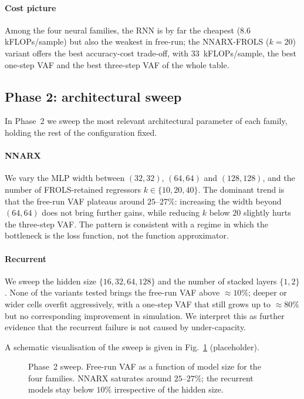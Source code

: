 \documentclass[conference]{IEEEtran}
\begin{document}
\paragraph{Cost picture} Among the four neural families, the RNN is
by far the cheapest ($8.6$\,kFLOPs/sample) but also the weakest in
free-run; the NNARX-FROLS ($k=20$) variant offers the best
accuracy-cost trade-off, with $33$~kFLOPs/sample, the best one-step
VAF and the best three-step VAF of the whole table.

\subsection{Phase 2: architectural sweep}\label{sec:phase2}

In Phase~2 we sweep the most relevant architectural parameter of each
family, holding the rest of the configuration fixed.

\paragraph{NNARX} We vary the MLP width between $(32,32)$, $(64,64)$
and $(128,128)$, and the number of FROLS-retained regressors
$k\in\{10,20,40\}$. The dominant trend is that the free-run VAF
plateaus around $25$--$27\%$: increasing the width beyond $(64,64)$
does not bring further gains, while reducing $k$ below $20$ slightly
hurts the three-step VAF. The pattern is consistent with a regime in
which the bottleneck is the loss function, not the function
approximator.

\paragraph{Recurrent} We sweep the hidden size $\{16,32,64,128\}$ and
the number of stacked layers $\{1,2\}$. None of the variants tested
brings the free-run VAF above $\approx 10\%$; deeper or wider cells
overfit aggressively, with a one-step VAF that still grows up to
$\approx 80\%$ but no corresponding improvement in simulation. We
interpret this as further evidence that the recurrent failure is not
caused by under-capacity.

A schematic visualisation of the sweep is given in
Fig.~\ref{fig:phase2} (placeholder).

\begin{figure}[t]
\centering
\fbox{\rule{0pt}{4.5cm}\rule{0.85\linewidth}{0pt}}
\caption{Phase~2 sweep. Free-run VAF as a function of model size for
the four families. NNARX saturates around $25$--$27\%$; the recurrent
models stay below $10\%$ irrespective of the hidden size.}
\label{fig:phase2}
\end{figure}
\end{document}
